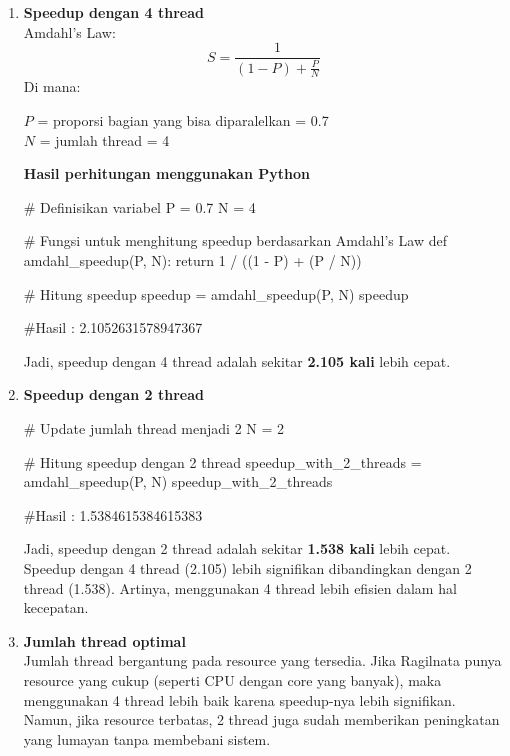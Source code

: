 \documentclass[12pt]{article}
\begin{document}
\begin{enumerate}
    \item \textbf{Speedup dengan 4 thread} \\
    Amdahl's Law:
        \[
        S = \frac{1}{(1 - P) + \frac{P}{N}}
        \]
        Di mana:

        $P$ = proporsi bagian yang bisa diparalelkan = 0.7 \\
        $N$ = jumlah thread = 4

        \textbf{Hasil perhitungan menggunakan Python}

    \begin{python}
        # Definisikan variabel
        P = 0.7
        N = 4
            
        # Fungsi untuk menghitung speedup berdasarkan Amdahl's Law
         def amdahl_speedup(P, N):
            return 1 / ((1 - P) + (P / N))
            
        # Hitung speedup
        speedup = amdahl_speedup(P, N)
        speedup

        #Hasil : 2.1052631578947367
           
    \end{python}
    Jadi, speedup dengan 4 thread adalah sekitar \textbf{2.105 kali} lebih cepat.
    
    \item \textbf{Speedup dengan 2 thread} \\
    \begin{python}
        # Update jumlah thread menjadi 2
        N = 2

        # Hitung speedup dengan 2 thread
        speedup_with_2_threads = amdahl_speedup(P, N)
        speedup_with_2_threads

        #Hasil : 1.5384615384615383
    \end{python}
    Jadi, speedup dengan 2 thread adalah sekitar \textbf{1.538 kali} lebih cepat. \\
    Speedup dengan 4 thread (2.105) lebih signifikan dibandingkan dengan 2 thread (1.538). Artinya, menggunakan 4 thread lebih efisien dalam hal kecepatan.
    
    \item \textbf{Jumlah thread optimal} \\
    Jumlah thread bergantung pada resource yang tersedia. Jika Ragilnata punya resource yang cukup (seperti CPU dengan core yang banyak), maka menggunakan 4 thread lebih baik karena speedup-nya lebih signifikan. Namun, jika resource terbatas, 2 thread juga sudah memberikan peningkatan yang lumayan tanpa membebani sistem.
\end{enumerate}
\end{document}
